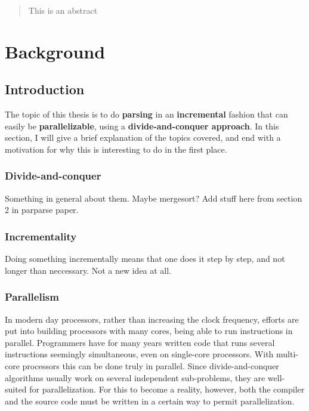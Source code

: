 \documentclass[a4paper,12pt,twosided]{report}
\begin{document}


\begin{abstract}
This is an abstract
\end{abstract}

\tableofcontents

%
%

\chapter{Background}

\section{Introduction}
The topic of this thesis is to do \textbf{parsing} in an \textbf{incremental}
fashion that can easily be \textbf{parallelizable}, using a
\textbf{divide-and-conquer approach}. In this section, I will give a brief
explanation of the topics covered, and end with a motivation for why this is
interesting to do in the first place.

\subsection{Divide-and-conquer}
Something in general about them. Maybe mergesort?
Add stuff here from section 2 in parparse paper.

\subsection{Incrementality}
Doing something incrementally means that one does it step by step, and not
longer than neccessary. Not a new idea at all. 

\subsection{Parallelism}
In modern day processors, rather than increasing the clock frequency, efforts are
put into building processors with many cores, being able to run instructions in
parallel. Programmers have for many years written code that runs several
instructions seemingly simultaneous, even on single-core processors. With
multi-core processors this can be done truly in parallel. Since divide-and-conquer
algorithms usually work on several independent sub-problems, they are
well-suited for parallelization. For this to become a reality, however, both the
compiler and the source code must be written in a certain way to permit
parallelization.
\end{document}
